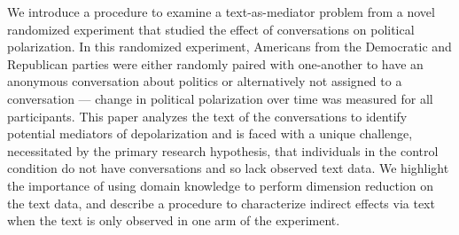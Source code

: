 We introduce a procedure to examine a text-as-mediator problem from a novel randomized experiment that studied the effect of conversations on political polarization. In this randomized experiment, Americans from the Democratic and Republican parties were either randomly paired with one-another to have an anonymous conversation about politics or alternatively not assigned to a conversation — change in political polarization over time was measured for all participants. This paper analyzes the text of the conversations to identify potential mediators of depolarization and is faced with a unique challenge, necessitated by the primary research hypothesis, that individuals in the control condition do not have conversations and so lack observed text data. We highlight the importance of using domain knowledge to perform dimension reduction on the text data, and describe a procedure to characterize indirect effects via text when the text is only observed in one arm of the experiment.
